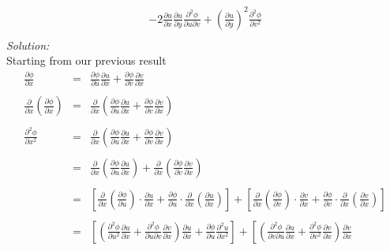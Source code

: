 \documentclass[10pt]{amsart}
\theoremstyle{nonumberplain}
\begin{document}
\begin{enumerate}[label={\bf {\arabic*}:}]
\begin{eqnarray*}
							- 2 \frac{\partial u}{\partial x} \frac{\partial u}{\partial y} \frac{\partial^2 \phi}{\partial u \partial v}
							+ \left(\frac{\partial u}{\partial y}\right)^2 \frac{\partial^2 \phi}{\partial v^2} \\
\end{eqnarray*}
\textit{Solution:} \\
Starting from our previous result
\begin{eqnarray*}
\frac{\partial\phi}{\partial x} &=& \frac{\partial\phi}{\partial u} \frac{\partial u}{\partial x} + \frac{\partial\phi}{\partial v} \frac{\partial v}{\partial x} \\ \\
\frac{\partial}{\partial x} \left(\frac{\partial\phi}{\partial x}\right) &=& \frac{\partial}{\partial x} \left(\frac{\partial\phi}{\partial u} \frac{\partial u}{\partial x} + \frac{\partial\phi}{\partial v} \frac{\partial v}{\partial x}\right) \\ \\
\frac{\partial^2\phi}{\partial x^2} &=& \frac{\partial}{\partial x} \left(\frac{\partial\phi}{\partial u} \frac{\partial u}{\partial x} + \frac{\partial\phi}{\partial v} \frac{\partial v}{\partial x}\right) \\ \\
						&=& \frac{\partial}{\partial x} \left(\frac{\partial\phi}{\partial u} \frac{\partial u}{\partial x}\right)
							+ \frac{\partial}{\partial x}  \left(\frac{\partial\phi}{\partial v} \frac{\partial v}{\partial x}\right) \\ \\
						&=& \left[ 
							\frac{\partial}{\partial x} \left( \frac{\partial\phi}{\partial u} \right) \cdot \frac{\partial u}{\partial x}
							+ \frac{\partial\phi}{\partial u} \cdot \frac{\partial}{\partial x} \left(\frac{\partial u}{\partial x} \right)
						\right]
							+ \left[ 
							\frac{\partial}{\partial x} \left( \frac{\partial\phi}{\partial v} \right) \cdot \frac{\partial v}{\partial x}
							+ \frac{\partial\phi}{\partial v} \cdot \frac{\partial}{\partial x} \left(\frac{\partial v}{\partial x} \right)
						\right] \\ \\
						&=& \left[ 
							\left( \frac{\partial^2 \phi}{\partial u^2} \frac{\partial u}{\partial x} + \frac{\partial^2 \phi}{\partial u \partial v} \frac{\partial v}{\partial x} \right) \frac{\partial u}{\partial x}
							+ \frac{\partial\phi}{\partial u} \frac{\partial^2 u}{\partial x^2}
						\right] 
							+ \left[ 
							\left( \frac{\partial^2 \phi}{\partial v \partial u} \frac{\partial u}{\partial x} + \frac{\partial^2 \phi}{\partial v^2} \frac{\partial v}{\partial x} \right) \frac{\partial v}{\partial x}

\end{eqnarray*}
\end{enumerate}
\end{document}
